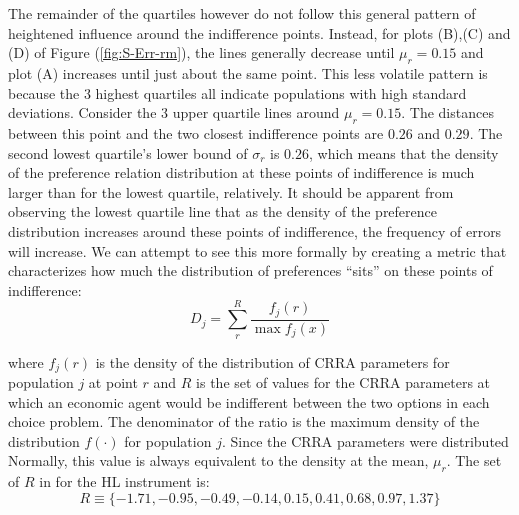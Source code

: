 \documentclass[11pt,a4paper]{report}
\providecommand{\DIFaddbegin}{} %
\providecommand{\DIFaddend}{} %
\providecommand{\DIFdelbegin}{} %
\providecommand{\DIFdelend}{} %
\newcommand{\DIFscaledelfig}{0.5}
\newlength{\DIFdelgraphicswidth} %
\newlength{\DIFdelgraphicsheight} %
\newcommand{\DIFaddincludegraphics}[2][]{{\color{blue}\fbox{\DIFOincludegraphics[#1]{#2}}}} %
\newcommand{\DIFdelincludegraphics}[2][]{%
\sbox{\DIFdelgraphicsbox}{\DIFOincludegraphics[#1]{#2}}%
\settoboxwidth{\DIFdelgraphicswidth}{\DIFdelgraphicsbox} %
\settoboxtotalheight{\DIFdelgraphicsheight}{\DIFdelgraphicsbox} %
\scalebox{\DIFscaledelfig}{%
\parbox[b]{\DIFdelgraphicswidth}{\usebox{\DIFdelgraphicsbox}\\[-\baselineskip] \rule{\DIFdelgraphicswidth}{0em}}\llap{\resizebox{\DIFdelgraphicswidth}{\DIFdelgraphicsheight}{%
\setlength{\unitlength}{\DIFdelgraphicswidth}%
\begin{picture}(1,1)%
\thicklines\linethickness{2pt} %
{\color[rgb]{1,0,0}\put(0,0){\framebox(1,1){}}}%
{\color[rgb]{1,0,0}\put(0,0){\line( 1,1){1}}}%
{\color[rgb]{1,0,0}\put(0,1){\line(1,-1){1}}}%
\end{picture}%
}\hspace*{3pt}}} %
} %
\DeclareRobustCommand{\DIFaddbegin}{\DIFOaddbegin \let\includegraphics\DIFaddincludegraphics} %
\DeclareRobustCommand{\DIFaddend}{\DIFOaddend \let\includegraphics\DIFOincludegraphics} %
\DeclareRobustCommand{\DIFdelbegin}{\DIFOdelbegin \let\includegraphics\DIFdelincludegraphics} %
\DeclareRobustCommand{\DIFdelend}{\DIFOaddend \let\includegraphics\DIFOincludegraphics} %
\begin{document}
\addtocounter{footnote}{-1}

The remainder of the quartiles however do not follow this general pattern of heightened influence around the indifference points.
Instead, for plots (B),(C) and (D) of Figure (\ref{fig:S-Err-rm}), the lines generally decrease until $\mu_r = 0.15$ and plot (A) increases until just about the same point.
This less volatile pattern is because the 3 highest quartiles all indicate populations with high standard deviations.
Consider the 3 upper quartile lines around $\mu_r = 0.15$.
The distances between this point and the two closest indifference points are $0.26$ and $0.29$.
The second lowest quartile's lower bound of $\sigma_r$ is $0.26$, which means that the density of the preference relation distribution at these points of indifference is much larger than for the lowest quartile, relatively.
It should be apparent from observing the lowest quartile line that as the density of the preference distribution increases around these points of indifference, the frequency of errors will increase.
We can attempt to see this more formally by creating a metric that characterizes how much the distribution of preferences \enquote{sits} on these points of indifference:
\begin{equation}
	\DIFdelbegin %
\DIFdelend \DIFaddbegin \label{eq3:Dstat}
	\DIFaddend D_j = \sum_r^R \frac{f_j(r)}{\max f_j(x)}
\end{equation}

\noindent where $f_j(r)$ is the density of the distribution of CRRA parameters for population $j$ at point $r$ and $R$ is the set of values for the CRRA parameters at which an economic agent would be indifferent between the two options in each choice problem.
The denominator of the ratio is the maximum density of the distribution $f(\cdot)$ for population $j$.
Since the CRRA parameters were distributed Normally, this value is always equivalent to the density at the mean, $\mu_r$.
The set of $R$ in for the HL instrument is:
\begin{equation}
	R \equiv \{-1.71, -0.95, -0.49, -0.14, 0.15, 0.41, 0.68, 0.97, 1.37\}
\end{equation}
\end{document}
